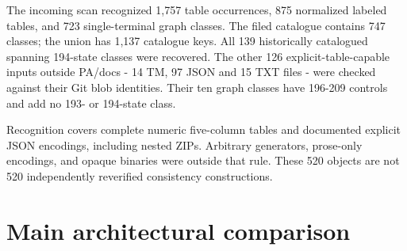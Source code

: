 \documentclass[10pt,a4paper]{article}
\begin{document}
The incoming scan recognized 1,757 table occurrences, 875 normalized labeled tables, and 723 single-terminal graph classes. The filed catalogue contains 747 classes; the union has 1,137 catalogue keys. All 139 historically catalogued spanning 194-state classes were recovered. The other 126 explicit-table-capable inputs outside PA/docs - 14 TM, 97 JSON and 15 TXT files - were checked against their Git blob identities. Their ten graph classes have 196-209 controls and add no 193- or 194-state class.

Recognition covers complete numeric five-column tables and documented explicit JSON encodings, including nested ZIPs. Arbitrary generators, prose-only encodings, and opaque binaries were outside that rule. These 520 objects are not 520 independently reverified consistency constructions.

\section{Main architectural comparison}\label{main-architectural-comparison}
\end{document}

